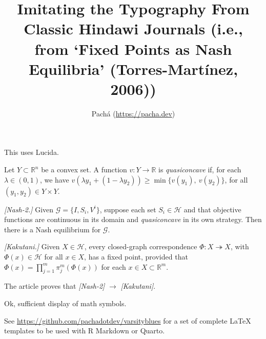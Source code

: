 \documentclass[letterpaper]{article}
\title{Imitating the Typography From Classic Hindawi Journals
(i.e., from `Fixed Points as Nash Equilibria' (Torres-Mart\'inez, 2006))}
\author{Pach\'a (\url{https://pacha.dev})}
\begin{document}
\maketitle

This uses Lucida.

Let $Y \subset \mathbb{R}^n$ be a convex set. A function
$v: Y \rightarrow \mathbb{R}$ is \emph{quasiconcave} if, for each
$\lambda \in (0,1)$, we have
$v(\lambda y_1 + (1 - \lambda y_2)) \geq \min\{v(y_1),\: v(y_2) \}$, for all
$(y_1, y_2) \in Y \times Y$.

\emph{[Nash-2.]} Given $\mathcal{G}=\{I,S_i,V^i\}$, suppose each set
$S_i \in \mathcal{H}$ and that objective functions are continuous in its
domain and \emph{quasiconcave} in its own strategy. Then there is a Nash
equilibrium for $\mathcal{G}$.

\emph{[Kakutani.]} Given $X \in \mathcal{H}$, every closed-graph correspondence
$\Phi: X \twoheadrightarrow X$, with $\Phi(x) \in \mathcal{H}$ for all
$x \in X$, has a fixed point, provided that
$\Phi(x) = \prod_{j=1}^{m} \pi_j^m(\Phi(x))$ for each
$x \in X \subset \mathbb{R}^m$.

The article proves that \emph{[Nash-2]} $\rightarrow$ \emph{[Kakutani]}.

Ok, sufficient display of math symbols.

See \url{https://github.com/pachadotdev/varsityblues} for a set of complete
LaTeX templates to be used with R Markdown or Quarto.
\end{document}
